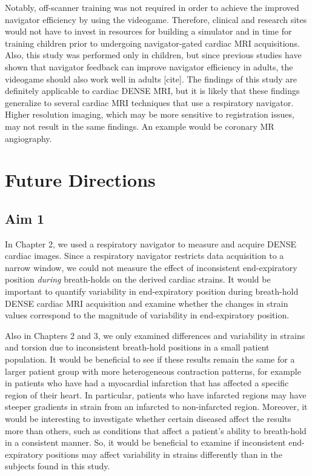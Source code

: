 	Notably, off-scanner training was not required in order to achieve the improved navigator efficiency by using the videogame. Therefore, clinical and research sites would not have to invest in resources for building a simulator and in time for training children prior to undergoing navigator-gated cardiac MRI acquisitions. Also, this study was performed only in children, but since previous studies have shown that navigator feedback can improve navigator efficiency in adults, the videogame should also work well in adults [cite]. The findings of this study are definitely applicable to cardiac DENSE MRI, but it is likely that these findings generalize to several cardiac MRI techniques that use a respiratory navigator. Higher resolution imaging, which may be more sensitive to registration issues, may not result in the same findings. An example would be coronary MR angiography.

\section{Future Directions}

\subsection{Aim 1}
	In Chapter 2, we used a respiratory navigator to measure and acquire DENSE cardiac images. Since a respiratory navigator restricts data acquisition to a narrow window, we could not measure the effect of inconsistent end-expiratory position \textit{during} breath-holds on the derived cardiac strains. It would be important to quantify variability in end-expiratory position during breath-hold DENSE cardiac MRI acquisition and examine whether the changes in strain values correspond to the magnitude of variability in end-expiratory position.
	
	Also in Chapters 2 and 3, we only examined differences and variability in strains and torsion due to inconsistent breath-hold positions in a small patient population. It would be beneficial to see if these results remain the same for a larger patient group with more heterogeneous contraction patterns, for example in patients who have had a myocardial infarction that has affected a specific region of their heart. In particular, patients who have infarcted regions may have steeper gradients in strain from an infarcted to non-infarcted region. Moreover, it would be interesting to investigate whether certain diseased affect the results more than others, such as conditions that affect a patient's ability to breath-hold in a consistent manner. So, it would be beneficial to examine if inconsistent end-expiratory positions may affect variability in strains differently than in the subjects found in this study.


